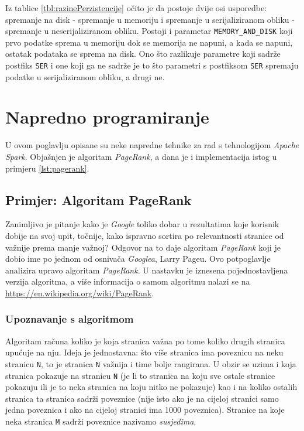 \documentclass[times, utf8, zavrsni, numeric]{fer}
\begin{document}
Iz tablice \ref{tbl:razinePerzistencije} očito je da postoje dvije osi usporedbe: spremanje na disk - spremanje u memoriju i spremanje u serijaliziranom obliku - spremanje u neserijaliziranom obliku. Postoji i parametar \texttt{MEMORY\_AND\_DISK} koji prvo podatke sprema u memoriju dok se memorija ne napuni, a kada se napuni, ostatak podataka se sprema na disk. Ono što razlikuje parametre koji sadrže postfiks \texttt{SER} i one koji ga ne sadrže je to što parametri s postfiksom \texttt{SER} spremaju podatke u serijaliziranom obliku, a drugi ne.


\chapter{Napredno programiranje}
U ovom poglavlju opisane su neke napredne tehnike za rad s tehnologijom \emph{Apache Spark}. Objašnjen je algoritam \emph{PageRank}, a dana je i implementacija istog u primjeru \ref{lst:pagerank}.
\section{Primjer: Algoritam PageRank}
Zanimljivo je pitanje kako je \emph{Google} toliko dobar u rezultatima koje korisnik dobije na svoj upit, točnije, kako ispravno sortira po relevantnosti stranice od važnije prema manje važnoj? Odgovor na to daje algoritam \emph{PageRank} koji je dobio ime po jednom od osnivača \emph{Googlea}, Larry Pageu. Ovo potpoglavlje analizira upravo algoritam \emph{PageRank}. U nastavku je iznesena pojednostavljena verzija algoritma, a više informacija o samom algoritmu nalazi se na \url{https://en.wikipedia.org/wiki/PageRank}. 

\subsection{Upoznavanje s algoritmom}
Algoritam računa koliko je koja stranica važna po tome koliko drugih stranica upućuje na nju. Ideja je jednostavna: što više stranica ima poveznicu na neku stranicu \texttt{N}, to je stranica \texttt{N} važnija i time bolje rangirana. U obzir se uzima i koja stranica pokazuje na stranicu \texttt{N} (je li to stranica na koju sve ostale stranice pokazuju ili je to neka stranica na koju nitko ne pokazuje) kao i na koliko ostalih stranica ta stranica sadrži poveznice (nije isto ako je na cijeloj stranici samo jedna poveznica i ako na cijeloj stranici ima 1000 poveznica). Stranice na koje neka stranica \texttt{M} sadrži poveznice nazivamo \emph{susjedima}.
\end{document}
